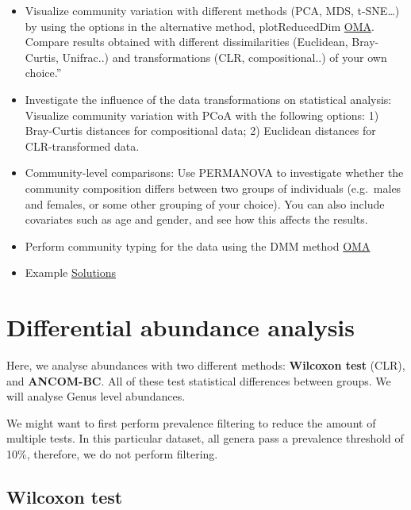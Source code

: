 \documentclass[
  oneside]{book}
\begin{document}
\begin{itemize}
\item
  Visualize community variation with different methods (PCA, MDS, t-SNE\ldots) by using the options in the alternative method, plotReducedDim \href{https://microbiome.github.io/OMA/microbiome-diversity.html\#estimating-beta-diversity}{OMA}. Compare results obtained with different dissimilarities (Euclidean, Bray-Curtis, Unifrac..) and transformations (CLR, compositional..) of your own choice.''
\item
  Investigate the influence of the data transformations on
  statistical analysis: Visualize community variation with PCoA with
  the following options: 1) Bray-Curtis distances for compositional
  data; 2) Euclidean distances for CLR-transformed data.
\item
  Community-level comparisons: Use PERMANOVA to investigate whether
  the community composition differs between two groups of individuals
  (e.g.~males and females, or some other grouping of your
  choice). You can also include covariates such as age and gender,
  and see how this affects the results.
\item
  Perform community typing for the data using the DMM method \href{https://microbiome.github.io/OMA/microbiome-community.html\#community-typing}{OMA}
\item
  Example \href{08-5-ex-sol-ADHD.html}{Solutions}
\end{itemize}

\hypertarget{differential-abundance-analysis}{%
\chapter{Differential abundance analysis}\label{differential-abundance-analysis}}

Here, we analyse abundances with two different methods: \textbf{Wilcoxon test} (CLR),
and \textbf{ANCOM-BC}. All of these test statistical differences between groups.
We will analyse Genus level abundances.

We might want to first perform prevalence filtering to reduce the amount of multiple tests. In this particular dataset, all genera pass a prevalence threshold of 10\%, therefore, we do not perform filtering.

\hypertarget{wilcoxon-test}{%
\section{Wilcoxon test}\label{wilcoxon-test}}
\end{document}
